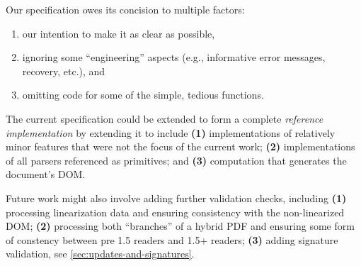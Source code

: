 Our specification owes its concision to multiple factors:
\begin{enumerate}
\item our intention to make it as clear as possible,
\item ignoring some ``engineering'' aspects (e.g., informative error
   messages, recovery, etc.), and
\item omitting code for some of the simple, tedious functions.
\end{enumerate}
The current specification could be extended to form a complete
\emph{reference implementation} by extending it to include
%
\textbf{(1)} implementations of relatively minor features that were
not the focus of the current work;
%
\textbf{(2)} implementations of all parsers referenced as primitives; and
%
\textbf{(3)} computation that generates the document's DOM.

Future work might also involve adding further validation checks,
including %
\textbf{(1)} processing linearization data and ensuring consistency
with the non-linearized DOM; %
\textbf{(2)} processing both ``branches'' of a hybrid PDF and ensuring
some form of constency between pre 1.5 readers and 1.5+ readers; %
\textbf{(3)} adding signature validation, see
\cref{sec:updates-and-signatures}.


\iffalse
\begin{code}

trailersConsistentAcrossUpdates :: [Update] -> Bool
trailersConsistentAcrossUpdates = stub

-- signatures above:
removeFrees m = M.mapMaybe
                  (\x -> case x of Right y -> Just y
                                   _       -> Nothing)
                  m
thawXRefEntry = notImplementedYet
getObjIds = notImplementedYet

\end{code}
\fi

